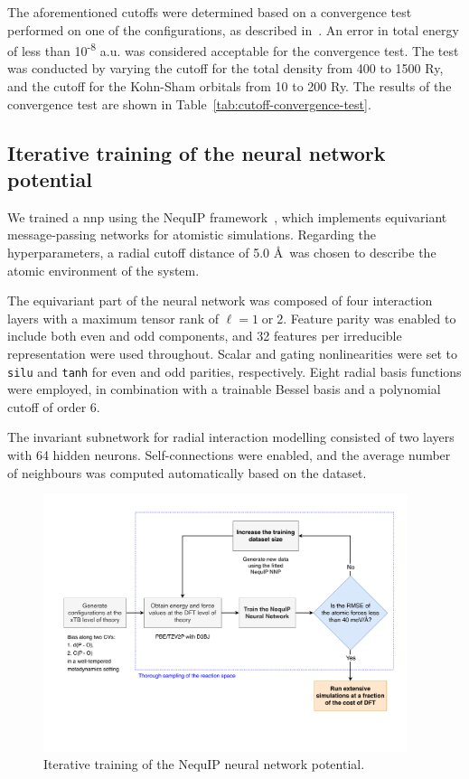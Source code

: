 The aforementioned cutoffs were determined based on a convergence test performed on one of the configurations, as described in~\citep{cp2k_developersHowConvergeCUTOFF}. An error in total energy of less than 10\textsuperscript{-8} a.u. was considered acceptable for the convergence test. The test was conducted by varying the cutoff for the total density from 400 to 1500 Ry, and the cutoff for the Kohn-Sham orbitals from 10 to 200 Ry. The results of the convergence test are shown in Table~\ref{tab:cutoff-convergence-test}.



\subsection{Iterative training of the neural network potential} \label{subsec:iterative-training-of-the-neural-network-potential}
We trained a \ac{nnp} using the NequIP framework~\citep{batznerE3equivariantGraphNeural2022}, which implements equivariant message-passing networks for atomistic simulations. Regarding the hyperparameters, a radial cutoff distance of 5.0 \AA\ was chosen to describe the atomic environment of the system.

The equivariant part of the neural network was composed of four interaction layers with a maximum tensor rank of $\ell = 1 \; \text{or} \; 2$. Feature parity was enabled to include both even and odd components, and 32 features per irreducible representation were used throughout. Scalar and gating nonlinearities were set to \texttt{silu} and \texttt{tanh} for even and odd parities, respectively. Eight radial basis functions were employed, in combination with a trainable Bessel basis and a polynomial cutoff of order 6.

The invariant subnetwork for radial interaction modelling consisted of two layers with 64 hidden neurons. Self-connections were enabled, and the average number of neighbours was computed automatically based on the dataset.

\begin{figure}[t!]
    \centering
    \includegraphics[width=0.95\textwidth]{Figures/3_Computational_details/methods_workflow_diagram.pdf}
    \caption{Iterative training of the NequIP neural network potential.}
    \label{fig:iterative-training}
\end{figure}

